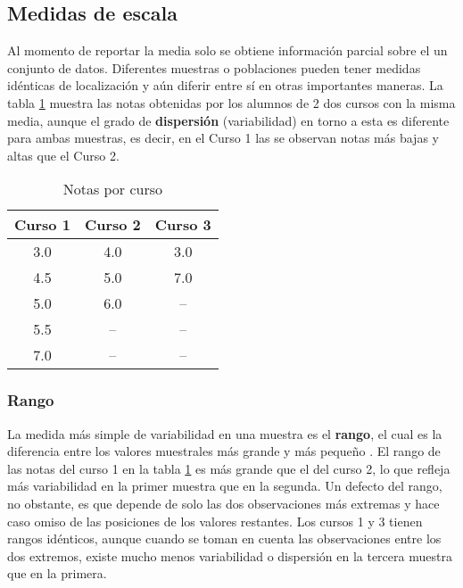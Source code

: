 \documentclass[
]{book}
\begin{document}
\hypertarget{medidas-de-escala}{%
\subsection{Medidas de escala}\label{medidas-de-escala}}

Al momento de reportar la media solo se obtiene información parcial sobre el un conjunto de datos. Diferentes muestras o poblaciones pueden tener medidas idénticas de localización y aún diferir entre sí en otras importantes maneras. La tabla \ref{tab:variabilidad} muestra las notas obtenidas por los alumnos de 2 dos cursos con la misma media, aunque el grado de \textbf{dispersión} (variabilidad) en torno a esta es diferente para ambas muestras, es decir, en el Curso 1 las se observan notas más bajas y altas que el Curso 2.

\begin{table}

\caption{\label{tab:variabilidad}Notas por curso}
\centering
\begin{tabular}[t]{ccc}
\toprule
Curso 1 & Curso 2 & Curso 3\\
\midrule
3.0 & 4.0 & 3.0\\
4.5 & 5.0 & 7.0\\
5.0 & 6.0 & --\\
5.5 & -- & --\\
7.0 & -- & --\\
\bottomrule
\end{tabular}
\end{table}

\hypertarget{rango}{%
\subsubsection*{Rango}\label{rango}}

La medida más simple de variabilidad en una muestra es el \textbf{rango}, el cual es la diferencia entre los valores muestrales más grande y más pequeño \citep[página 32]{Devore}. El rango de las notas del curso 1 en la tabla \ref{tab:variabilidad} es más grande que el del curso 2, lo que refleja más variabilidad en la primer muestra que en la segunda. Un defecto del rango, no obstante, es que depende de solo las dos observaciones más extremas y hace caso omiso de las posiciones de los valores restantes. Los cursos 1 y 3 tienen rangos idénticos, aunque cuando se toman en cuenta las observaciones entre los dos extremos, existe mucho menos variabilidad o dispersión en la tercera muestra que en la primera.
\end{document}
